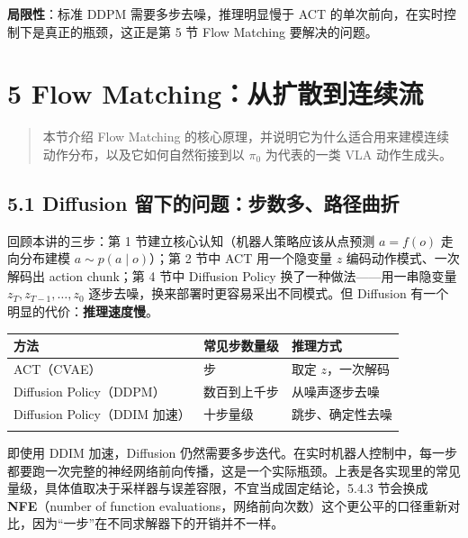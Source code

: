 \documentclass[
  chinese,
]{ctexart}
\begin{document}
\textbf{局限性}：标准 DDPM 需要多步去噪，推理明显慢于 ACT
的单次前向，在实时控制下是真正的瓶颈，这正是第 5 节 Flow Matching
要解决的问题。

\section{5 Flow
Matching：从扩散到连续流}\label{flow-matchingux4eceux6269ux6563ux5230ux8fdeux7eedux6d41}

\begin{quote}
本节介绍 Flow Matching
的核心原理，并说明它为什么适合用来建模连续动作分布，以及它如何自然衔接到以
\(\pi_0\) 为代表的一类 VLA 动作生成头。
\end{quote}

\subsection{5.1 Diffusion
留下的问题：步数多、路径曲折}\label{diffusion-ux7559ux4e0bux7684ux95eeux9898ux6b65ux6570ux591aux8defux5f84ux66f2ux6298}

回顾本讲的三步：第 1 节建立核心认知（机器人策略应该从点预测 \(a = f(o)\)
走向分布建模 \(a \sim p(a \mid o)\)）；第 2 节中 ACT 用一个隐变量 \(z\)
编码动作模式、一次解码出 action chunk；第 4 节中 Diffusion Policy
换了一种做法------用一串隐变量 \(z_T, z_{T-1}, \ldots, z_0\)
逐步去噪，换来部署时更容易采出不同模式。但 Diffusion
有一个明显的代价：\textbf{推理速度慢}。

\begin{center}
\begin{tabular}{@{}>{\raggedright\arraybackslash}p{} >{\raggedright\arraybackslash}p{} >{\raggedright\arraybackslash}p{}@{}}
\toprule\noalign{}
方法 & 常见步数量级 & 推理方式 \\
\midrule\noalign{}
ACT（CVAE） & 1 步 & 取定 \(z\)，一次解码 \\
Diffusion Policy（DDPM） & 数百到上千步 & 从噪声逐步去噪 \\
Diffusion Policy（DDIM 加速） & 十步量级 & 跳步、确定性去噪 \\
\bottomrule\noalign{}
\end{tabular}
\end{center}

即使用 DDIM 加速，Diffusion
仍然需要多步迭代。在实时机器人控制中，每一步都要跑一次完整的神经网络前向传播，这是一个实际瓶颈。上表是各实现里的常见量级，具体值取决于采样器与误差容限，不宜当成固定结论，5.4.3
节会换成 \textbf{NFE}（number of function
evaluations，网络前向次数）这个更公平的口径重新对比，因为``一步''在不同求解器下的开销并不一样。
\end{document}
